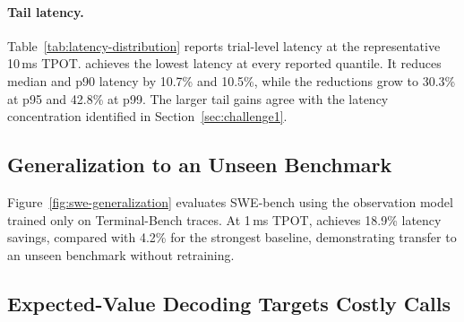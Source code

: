 \paragraph{Tail latency.}
Table~\ref{tab:latency-distribution} reports trial-level latency at the representative 10\,ms TPOT. 
\sysname{} achieves the lowest latency at every reported quantile. It
reduces median and p90 latency by 10.7\% and 10.5\%, while the reductions grow
to 30.3\% at p95 and 42.8\% at p99. The larger tail gains agree with the
latency concentration identified in Section~\ref{sec:challenge1}.

\begin{table}[t]
\centering
\setlength{\tabcolsep}{3.0pt}
\caption{End-to-end latency distribution (seconds) per trial
at 10\,ms actor TPOT.}
\label{tab:latency-distribution}
\end{table}

\subsection{Generalization to an Unseen Benchmark}

Figure~\ref{fig:swe-generalization} evaluates SWE-bench using the observation
model trained only on Terminal-Bench traces. At 1\,ms TPOT, \sysname{} achieves
18.9\% latency savings, compared with 4.2\% for the strongest baseline,
demonstrating transfer to an unseen benchmark without retraining.

\subsection{Expected-Value Decoding Targets Costly Calls}

